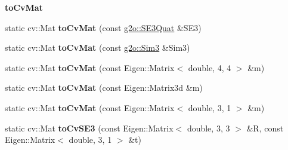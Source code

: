 \begin{Indent}{\bf to\-Cv\-Mat}\par
\begin{DoxyCompactItemize}
\item 
\hypertarget{classORB__SLAM2_1_1Converter_ac9d5a9ea7de26d34047aa0afddaa2091}{static cv\-::\-Mat {\bfseries to\-Cv\-Mat} (const \hyperlink{classg2o_1_1SE3Quat}{g2o\-::\-S\-E3\-Quat} \&S\-E3)}\label{classORB__SLAM2_1_1Converter_ac9d5a9ea7de26d34047aa0afddaa2091}

\item 
\hypertarget{classORB__SLAM2_1_1Converter_a4bc1702afbd33a5d90d39f1940157e08}{static cv\-::\-Mat {\bfseries to\-Cv\-Mat} (const \hyperlink{structg2o_1_1Sim3}{g2o\-::\-Sim3} \&Sim3)}\label{classORB__SLAM2_1_1Converter_a4bc1702afbd33a5d90d39f1940157e08}

\item 
\hypertarget{classORB__SLAM2_1_1Converter_a93055164116a8f35ecc5a9a5dcad1ca0}{static cv\-::\-Mat {\bfseries to\-Cv\-Mat} (const Eigen\-::\-Matrix$<$ double, 4, 4 $>$ \&m)}\label{classORB__SLAM2_1_1Converter_a93055164116a8f35ecc5a9a5dcad1ca0}

\item 
\hypertarget{classORB__SLAM2_1_1Converter_a7558c9fde7b818582bee8b4a4ff00793}{static cv\-::\-Mat {\bfseries to\-Cv\-Mat} (const Eigen\-::\-Matrix3d \&m)}\label{classORB__SLAM2_1_1Converter_a7558c9fde7b818582bee8b4a4ff00793}

\item 
\hypertarget{classORB__SLAM2_1_1Converter_a6748f1ecb782efc7741c1d2f6fbbed22}{static cv\-::\-Mat {\bfseries to\-Cv\-Mat} (const Eigen\-::\-Matrix$<$ double, 3, 1 $>$ \&m)}\label{classORB__SLAM2_1_1Converter_a6748f1ecb782efc7741c1d2f6fbbed22}

\item 
\hypertarget{classORB__SLAM2_1_1Converter_a0972ca8f56ea15c1814f51be3804978f}{static cv\-::\-Mat {\bfseries to\-Cv\-S\-E3} (const Eigen\-::\-Matrix$<$ double, 3, 3 $>$ \&R, const Eigen\-::\-Matrix$<$ double, 3, 1 $>$ \&t)}\label{classORB__SLAM2_1_1Converter_a0972ca8f56ea15c1814f51be3804978f}

\end{DoxyCompactItemize}
\end{Indent}
